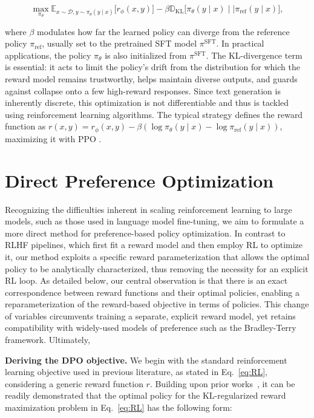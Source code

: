 \begin{equation}\label{eq:RL}
\max_{\pi_{\theta}}  \mathbb{E}_{x\sim \mathcal{D}, y\sim \pi_{\theta}(y \mid x)}\bigl[r_{\phi}(x, y)\bigr] - \beta\mathbb{D}_{\textrm{KL}}\bigl[\pi_{\theta}(y\mid x)\mid \mid \pi_\text{ref}(y\mid x)\bigr],
\end{equation}

where $\beta$ modulates how far the learned policy can diverge from the reference policy $\pi_\text{ref}$, usually set to the pretrained SFT model $\pi^\text{SFT}$. In practical applications, the policy $\pi_\theta$ is also initialized from $\pi^\text{SFT}$. The KL-divergence term is essential: it acts to limit the policy's drift from the distribution for which the reward model remains trustworthy, helps maintain diverse outputs, and guards against collapse onto a few high-reward responses. Since text generation is inherently discrete, this optimization is not differentiable and thus is tackled using reinforcement learning algorithms. The typical strategy \citep{ziegler2020finetuning, stiennon2022learning, bai2022training, ouyang2022training} defines the reward function as ${r(x, y) = r_{\phi}(x, y) -\beta (\log \pi_{\theta}(y\mid x) - \log \pi_\text{ref}(y\mid x))}$, maximizing it with PPO \cite{schulman2017proximal}.

\section{Direct Preference Optimization}\label{sec:DPO}

Recognizing the difficulties inherent in scaling reinforcement learning to large models, such as those used in language model fine-tuning, we aim to formulate a more direct method for preference-based policy optimization. In contrast to RLHF pipelines, which first fit a reward model and then employ RL to optimize it, our method exploits a specific reward parameterization that allows the optimal policy to be analytically characterized, thus removing the necessity for an explicit RL loop. As detailed below, our central observation is that there is an exact correspondence between reward functions and their optimal policies, enabling a reparameterization of the reward-based objective in terms of policies. This change of variables circumvents training a separate, explicit reward model, yet retains compatibility with widely-used models of preference such as the Bradley-Terry framework. Ultimately,

\textbf{Deriving the DPO objective.} We begin with the standard reinforcement learning objective used in previous literature, as stated in Eq.~\ref{eq:RL}, considering a generic reward function $r$. Building upon prior works~\citep{peters2007reinforcement, peng2019advantage, korbak2022reinforcement, go2023aligning}, it can be readily demonstrated that the optimal policy for the KL-regularized reward maximization problem in Eq.~\ref{eq:RL} has the following form:

